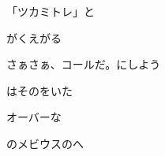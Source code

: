 \documentclass[a4paper,tate,twocolumn,12pt]{ltjtarticle}
\begin{document}
\begin{flushleft}
\begin{minipage}{\linewidth}
「ツカミトレ」と

がくえがる
\end{minipage}

\vspace{2em}

\noindent\begin{minipage}{\linewidth}
さぁさぁ、コールだ。にしよう

はそのをいた
\end{minipage}

\vspace{2em}

\noindent\begin{minipage}{\linewidth}
オーバーな

のメビウスのへ
\end{minipage}

\end{flushleft}
\end{document}
